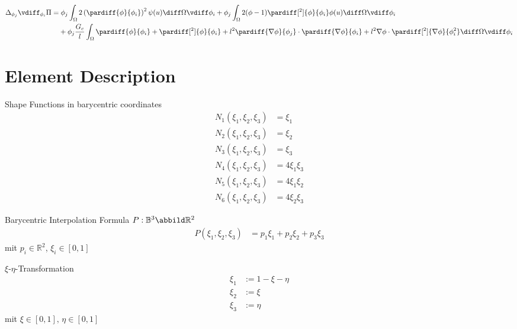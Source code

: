 \documentclass{mitschrift}
\begin{document}
\begin{align}
    \Delta_{\phi_j} \vdiff_{\phi_i} \Pi &= \phi_j \int_\Omega 2\left(\pardiff{\phi}{\phi_i}\right)^2 \psi(u) \diff \Omega \vdiff \phi_i 
    + \phi_j \int_\Omega 2(\phi -1 )\pardiff[^2]{\phi}{\phi_i} \phi(u) \diff \Omega \vdiff \phi_i \\
&\phantom{={}} +\phi_j \frac{G_c}{l} \int_\Omega \pardiff{\phi}{\phi_i} + \pardiff[^2]{\phi}{\phi_i} + l^2 \pardiff{\nabla \phi}{\phi_j} \cdot \pardiff{\nabla \phi}{\phi_i} + l^2 \nabla \phi \cdot \pardiff[^2]{\nabla \phi}{\phi_i^2} \diff \Omega \vdiff \phi_i
\end{align}

\section{Element Description}

\begin{marginfigure}
    \centering
\end{marginfigure}

Shape Functions in barycentric coordinates \begin{align}
    N_1(\xi_1,\xi_2,\xi_3) &= \xi_1 \\
    N_2(\xi_1,\xi_2,\xi_3) &= \xi_2 \\
    N_3(\xi_1,\xi_2,\xi_3) &= \xi_3 \\
    N_4(\xi_1,\xi_2,\xi_3) &= 4 \xi_1\xi_3 \\
    N_5(\xi_1,\xi_2,\xi_3) &= 4 \xi_1\xi_2 \\
    N_6(\xi_1,\xi_2,\xi_3) &= 4 \xi_2\xi_3
\end{align}

Barycentric Interpolation Formula $P: \mathbb{B}^3 \abbild \mathbb{R}^2$ \begin{align}
    P(\xi_1,\xi_2,\xi_3) &= p_1 \xi_1 + p_2 \xi_2 + p_3 \xi_3
\end{align} mit $p_i \in \mathbb{R}^2$, $\xi_i \in [0,1]$

$\xi$-$\eta$-Transformation \begin{align}
    \xi_1 &:=  1 - \xi - \eta  \\
    \xi_2 &:= \xi\\
    \xi_3 &:=  \eta
\end{align} mit $\xi \in [0,1],\, \eta \in [0,1]$
\end{document}
